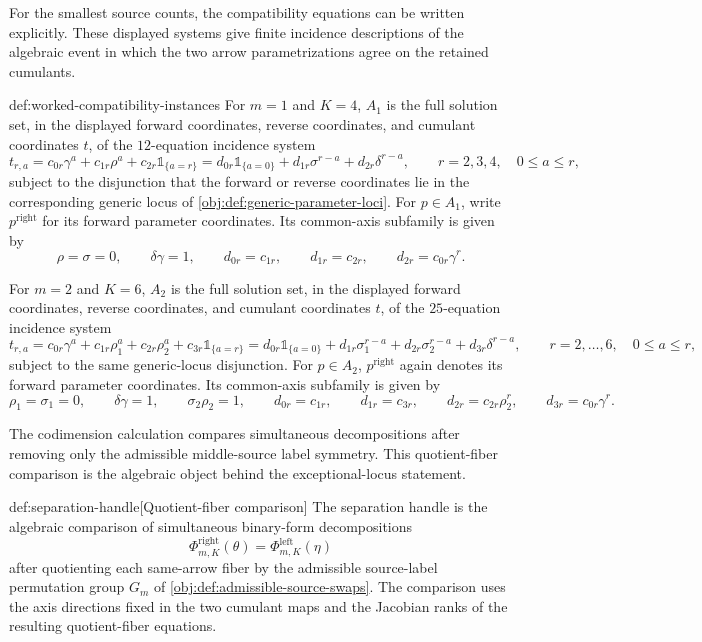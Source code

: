 For the smallest source counts, the compatibility equations can be written explicitly. These displayed systems give finite incidence descriptions of the algebraic event in which the two arrow parametrizations agree on the retained cumulants.

\begin{definitionv}{def:worked-compatibility-instances}
For \(m=1\) and \(K=4\), \(A_1\) is the full solution set, in the displayed forward coordinates, reverse coordinates, and cumulant coordinates \(t\), of the \(12\)-equation incidence system
\[
t_{r,a}
=
c_{0r}\gamma^a+c_{1r}\rho^a+c_{2r}\mathbb 1_{\{a=r\}}
=
d_{0r}\mathbb 1_{\{a=0\}}+d_{1r}\sigma^{r-a}+d_{2r}\delta^{r-a},
\qquad
r=2,3,4,\quad 0\leq a\leq r,
\]
subject to the disjunction that the forward or reverse coordinates lie in the corresponding generic locus of \cref{obj:def:generic-parameter-loci}. For \(p\in A_1\), write \(p^{\mathrm{right}}\) for its forward parameter coordinates. Its common-axis subfamily is given by
\[
\rho=\sigma=0,\qquad
\delta\gamma=1,\qquad
d_{0r}=c_{1r},\qquad
d_{1r}=c_{2r},\qquad
d_{2r}=c_{0r}\gamma^r.
\]

For \(m=2\) and \(K=6\), \(A_2\) is the full solution set, in the displayed forward coordinates, reverse coordinates, and cumulant coordinates \(t\), of the \(25\)-equation incidence system
\[
t_{r,a}
=
c_{0r}\gamma^a+c_{1r}\rho_1^a+c_{2r}\rho_2^a+c_{3r}\mathbb 1_{\{a=r\}}
=
d_{0r}\mathbb 1_{\{a=0\}}+d_{1r}\sigma_1^{r-a}+d_{2r}\sigma_2^{r-a}+d_{3r}\delta^{r-a},
\qquad
r=2,\ldots,6,\quad 0\leq a\leq r,
\]
subject to the same generic-locus disjunction. For \(p\in A_2\), \(p^{\mathrm{right}}\) again denotes its forward parameter coordinates. Its common-axis subfamily is given by
\[
\rho_1=\sigma_1=0,\qquad
\delta\gamma=1,\qquad
\sigma_2\rho_2=1,\qquad
d_{0r}=c_{1r},\qquad
d_{1r}=c_{3r},\qquad
d_{2r}=c_{2r}\rho_2^r,\qquad
d_{3r}=c_{0r}\gamma^r.
\]
\end{definitionv}

The codimension calculation compares simultaneous decompositions after removing only the admissible middle-source label symmetry. This quotient-fiber comparison is the algebraic object behind the exceptional-locus statement.

\begin{definitionv}{def:separation-handle}[Quotient-fiber comparison]
The separation handle is the algebraic comparison of simultaneous binary-form decompositions
\[
\Phi^{\mathrm{right}}_{m,K}(\theta)=\Phi^{\mathrm{left}}_{m,K}(\eta)
\]
after quotienting each same-arrow fiber by the admissible source-label permutation group \(G_m\) of \cref{obj:def:admissible-source-swaps}.  The comparison uses the axis directions fixed in the two cumulant maps and the Jacobian ranks of the resulting quotient-fiber equations.
\end{definitionv}

